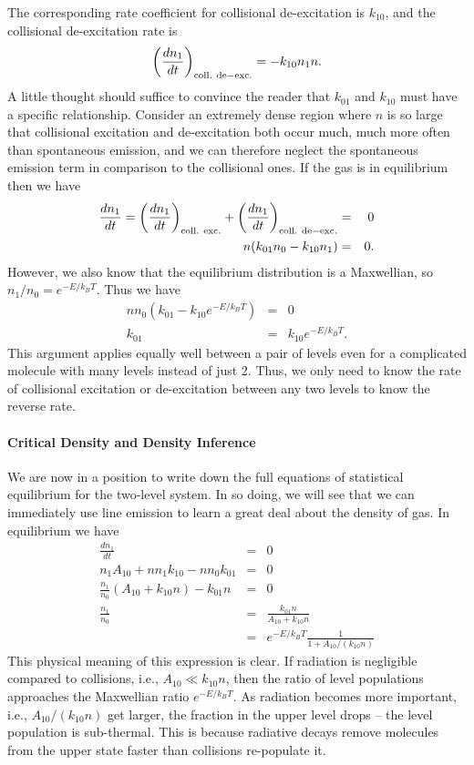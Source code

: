 The corresponding rate coefficient for collisional de-excitation is $k_{10}$, and the collisional de-excitation rate is
\begin{equation}
\left(\frac{dn_1}{dt}\right)_{\rm coll.~de-exc.} = -k_{10} n_1 n.
\end{equation}
A little thought should suffice to convince the reader that $k_{01}$ and $k_{10}$ must have a specific relationship. Consider an extremely dense region where $n$ is so large that collisional excitation and de-excitation both occur much, much more often than spontaneous emission, and we can therefore neglect the spontaneous emission term in comparison to the collisional ones. If the gas is in equilibrium then we have
\begin{eqnarray}
\frac{dn_1}{dt} = \left(\frac{dn_1}{dt}\right)_{\rm coll.~exc.} + \left(\frac{dn_1}{dt}\right)_{\rm coll.~de-exc.} & = & 0 \\
n (k_{01} n_0 - k_{10} n_1) & = & 0.
\end{eqnarray}
However, we also know that the equilibrium distribution is a Maxwellian, so $n_1/n_0 = e^{-E/k_B T}$. Thus we have
\begin{eqnarray}
n n_0 (k_{01} - k_{10} e^{-E/k_B T}) & = & 0 \\
k_{01} & = & k_{10} e^{-E/k_B T}.
\label{eq:detailed_balance}
\end{eqnarray}
This argument applies equally well between a pair of levels even for a complicated molecule with many levels instead of just 2. Thus, we only need to know the rate of collisional excitation or de-excitation between any two levels to know the reverse rate.

\paragraph{Critical Density and Density Inference}

We are now in a position to write down the full equations of statistical equilibrium for the two-level system. In so doing, we will see that we can immediately use line emission to learn a great deal about the density of gas. In equilibrium we have
\begin{eqnarray}
\frac{dn_1}{dt} & = & 0 \\
n_1 A_{10} + n n_1 k_{10} -n n_0 k_{01} & = & 0 \\
\frac{n_1}{n_0} \left(A_{10} + k_{10}n\right) - k_{01} n & = & 0\\
\frac{n_1}{n_0} & = & \frac{k_{01} n}{A_{10}+k_{10} n}\\
& = & e^{-E/k_B T} \frac{1}{1+A_{10}/(k_{10} n)}
\end{eqnarray}
This physical meaning of this expression is clear. If radiation is negligible compared to collisions, i.e., $A_{10} \ll k_{10} n$, then the ratio of level populations approaches the Maxwellian ratio $e^{-E/k_B T}$. As radiation becomes more important, i.e., $A_{10}/(k_{10} n)$ get larger, the fraction in the upper level drops -- the level population is sub-thermal. This is because radiative decays remove molecules from the upper state faster than collisions re-populate it.

